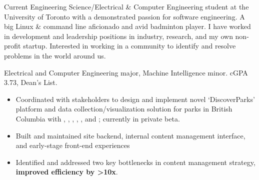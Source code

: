 \documentclass[10pt,a4paper,ragged2e,withhyper]{altacv}
\begin{document}

\makecvheader



\raggedright


Current Engineering Science/Electrical \& Computer Engineering student at the University of Toronto with a demonstrated passion for software engineering.
A big Linux \& command line aficionado and avid badminton player.
I have worked in development and leadership positions in industry, research, and my own non-profit startup. 
Interested in working in a community to identify and resolve problems in the world around us.


Electrical and Computer Engineering major, Machine Intelligence minor. cGPA 3.73, Dean's List.



\begin{itemize}
  \item Coordinated with stakeholders to design and implement novel `DiscoverParks' platform and data collection/visualization solution for parks in British Columbia with , , , , , and ; currently in private beta.
  \item Built and maintained site backend, internal content management interface, and early-stage front-end experiences
  \item Identified and addressed two key bottlenecks in content management strategy, \textbf{improved efficiency by >10x}.

\end{itemize}
\end{document}
